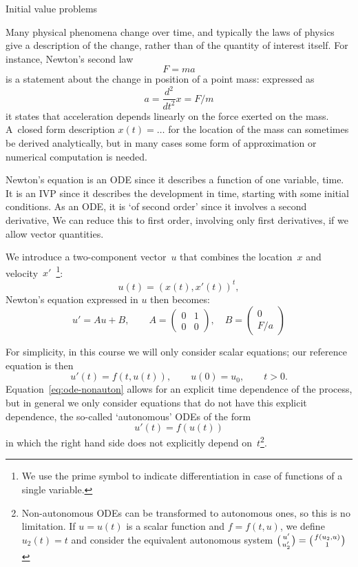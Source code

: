  {Initial value problems}
\label{sec:ode}

Many physical phenomena change over time, and typically the laws of
physics give a description of the change, rather than of the quantity
of interest itself. For instance, Newton's second law \[F=ma\] is a
statement about the change in position of a point mass: expressed as
\[ a=\frac{d^2}{dt^2}x=F/m \]
it states that acceleration depends linearly on the force exerted on
the mass. A~closed form description $x(t)=\ldots$ for the location of
the mass can sometimes be
derived analytically, but in many cases some form of approximation or
numerical computation is needed.

Newton's equation is an \ac{ODE} since it describes a function of one
variable, time. It is an \ac{IVP} since it describes the development
in time, starting with some initial conditions.  As an \ac{ODE}, it is
`of second order' since it involves a second derivative, We can reduce
this to first order, involving only first derivatives, if we allow
vector quantities. 

We introduce a two-component vector~$u$ that combines the location~$x$ and
velocity~$x'$~\footnote{We use the
  prime symbol to indicate differentiation in case of functions of a
  single variable.}:
\[ u(t)=(x(t),x'(t))^t,\]
Newton's equation expressed in $u$ then becomes:
\[ u'=Au+B,\qquad A=
\begin{pmatrix}
  0&1\\ 0& 0
\end{pmatrix},\quad B=
\begin{pmatrix}
  0\\ F/a
\end{pmatrix}
\]

For simplicity, in this course we will only consider scalar equations;
our reference equation is then
\begin{equation} u'(t)=f(t,u(t)),\qquad u(0)=u_0,\qquad t>0.
    \label{eq:ode-nonauton}
\end{equation}
Equation~\eqref{eq:ode-nonauton} allows for an explicit time dependence
of the process, but in general we only consider equations that 
do not have this explicit dependence,
the  so-called `autonomous'  \acp{ODE} of the form
\begin{equation}
  \label{eq:ode}
  u'(t)=f(u(t))
\end{equation}
in which the right hand side does not explicitly depend
on~$t$\footnote
{Non-autonomous \ac{ODE}s can be transformed to autonomous
  ones, so this is no limitation. If $u=u(t)$ is a scalar function and
  $f=f(t,u)$, we define $u_2(t)=t$ and consider the equivalent
autonomous system $\big({u'\atop u'_2}\bigr)=\bigl({f(u_2,u)\atop 1}\bigr)$}.


